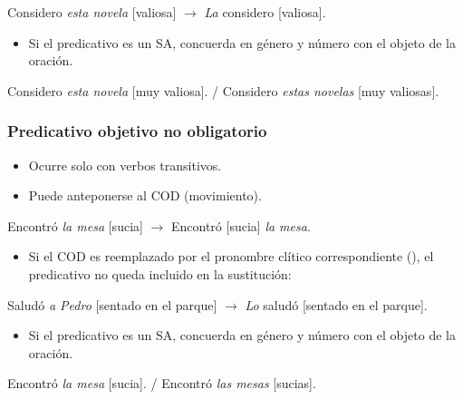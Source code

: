 \begin{exe}
  \ex Considero \textit{esta novela} [valiosa] $\rightarrow$ \textit{La}
      considero [valiosa].
\end{exe}

\begin{itemize}
  \item Si el predicativo es un SA, concuerda en género y número con el objeto
        de la oración.
\end{itemize}

\begin{exe}
  \ex Considero \textit{esta novela} [muy valiosa]. / Considero \textit{estas
      novelas} [muy valiosas].
\end{exe}

\subsubsection{Predicativo objetivo no obligatorio}\label{sec:09-pono}

\begin{itemize}
  \item Ocurre solo con verbos transitivos.
  \item Puede anteponerse al COD (movimiento).
\end{itemize}

\begin{exe}
  \ex Encontró \textit{la mesa} [sucia] $\rightarrow$ Encontró [sucia]
      \textit{la mesa}.
\end{exe}

\begin{itemize}
  \item Si el COD es reemplazado por el pronombre clítico correspondiente
        (), el predicativo no queda incluido en la
        sustitución:
\end{itemize}

\begin{exe}
  \ex Saludó \textit{a Pedro} [sentado en el parque] $\rightarrow$ \textit{Lo}
      saludó [sentado en el parque].
\end{exe}

\begin{itemize}
  \item Si el predicativo es un SA, concuerda en género y número con el objeto
        de la oración.
\end{itemize}

\begin{exe}
  \ex Encontró \textit{la mesa} [sucia]. / Encontró \textit{las mesas}
      [sucias].
\end{exe}

